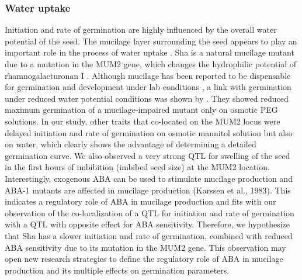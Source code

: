 \documentclass[8pt, twoside, a5paper]{report}
\begin{document}
\subsubsection{Water uptake}
Initiation and rate of germination are highly influenced by the overall water potential of the seed. The mucilage layer surrounding the seed appears to play an
important role in the process of water uptake \cite{Penfield:2001}. Sha is a natural mucilage mutant due to a mutation in the MUM2 gene, which changes the hydrophilic
potential of rhamnogalacturonan I \cite{Macquet:2007}. Although mucilage has been reported to be dispensable for germination and development under lab conditions
\cite{Arsovski:2010}, a link with germination under reduced water potential conditions was shown by \cite{Penfield:2001}. They showed reduced maximum germination of a
mucilage-impaired mutant only on osmotic PEG solutions. In our study, other traits that co-located on the MUM2 locus were delayed initiation and rate of germination on osmotic
mannitol solution but also on water, which clearly shows the advantage of determining a detailed germination curve. We also observed a very strong QTL for swelling of the seed
in the first hours of imbibition (imbibed seed size) at the MUM2 location. Interestingly, exogenous ABA can be used to stimulate mucilage production and ABA-1 mutants are
affected in mucilage production (Karssen et al., 1983). This indicates a regulatory role of ABA in mucilage production and fits with our observation of the co-localization of a QTL
for initiation and rate of germination with a QTL with opposite effect for ABA sensitivity. Therefore, we hypothesize that Sha has a slower initiation and rate of germination,
combined with reduced ABA sensitivity due to its mutation in the MUM2 gene. This observation may open new research strategies to define the regulatory role of ABA in
mucilage production and its multiple effects on germination parameters.
\end{document}
